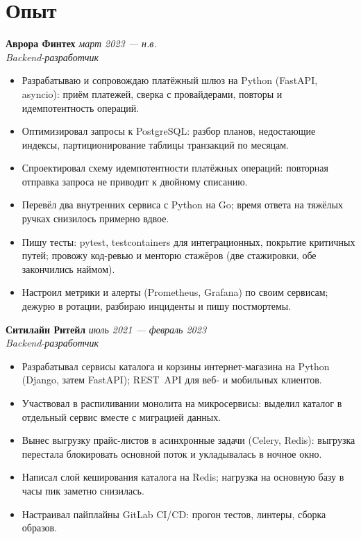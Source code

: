 \documentclass[a4paper,10pt]{article}
\newcommand{\CICD}{\mbox{CI/CD}}
\newcommand{\RESTAPI}{\mbox{REST API}}
\begin{document}
\section*{Опыт}

\textbf{Аврора Финтех} \hfill \textit{март 2023 --- н.в.}\\
\textit{Backend-разработчик}
\begin{itemize}
    \item Разрабатываю и сопровождаю платёжный шлюз на Python (FastAPI, asyncio):
          приём платежей, сверка с провайдерами, повторы и идемпотентность операций.
    \item Оптимизировал запросы к PostgreSQL: разбор планов, недостающие индексы,
          партиционирование таблицы транзакций по месяцам.
    \item Спроектировал схему идемпотентности платёжных операций: повторная отправка
          запроса не приводит к двойному списанию.
    \item Перевёл два внутренних сервиса с Python на Go; время ответа на тяжёлых
          ручках снизилось примерно вдвое.
    \item Пишу тесты: pytest, testcontainers для интеграционных, покрытие критичных
          путей; провожу код-ревью и менторю стажёров (две стажировки, обе
          закончились наймом).
    \item Настроил метрики и алерты (Prometheus, Grafana) по своим сервисам; дежурю
          в ротации, разбираю инциденты и пишу постмортемы.
\end{itemize}

\textbf{Ситилайн Ритейл} \hfill \textit{июль 2021 --- февраль 2023}\\
\textit{Backend-разработчик}
\begin{itemize}
    \item Разрабатывал сервисы каталога и корзины интернет-магазина на Python
          (Django, затем FastAPI); \RESTAPI{} для веб- и мобильных клиентов.
    \item Участвовал в распиливании монолита на микросервисы: выделил каталог
          в отдельный сервис вместе с миграцией данных.
    \item Вынес выгрузку прайс-листов в асинхронные задачи (Celery, Redis): выгрузка
          перестала блокировать основной поток и укладывалась в ночное окно.
    \item Написал слой кеширования каталога на Redis; нагрузка на основную базу
          в часы пик заметно снизилась.
    \item Настраивал пайплайны GitLab \CICD{}: прогон тестов, линтеры, сборка образов.
\end{itemize}
\end{document}
